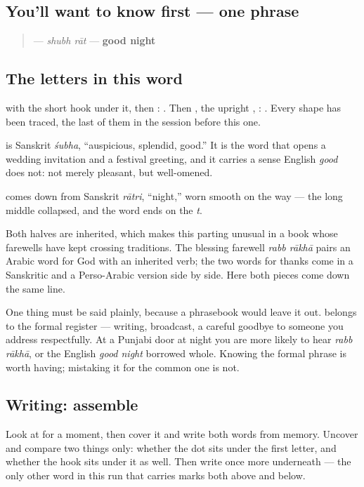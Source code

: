 \subsection*{You'll want to know first — one phrase}
\begin{quote}
\textbf{ } — \emph{shubh rāt} — \textbf{good night}
\end{quote}

\subsection*{The letters in this word}
\textbf{} with the short hook under it, then \textbf{}: \textbf{}. Then \textbf{}, the upright \textbf{}, \textbf{}: \textbf{}. Every shape has been traced, the last of them in the session before this one.

\begin{cousinweb}
\textbf{} is Sanskrit \emph{śubha}, \textquotedblleft{}auspicious, splendid, good.\textquotedblright{} It is the word that opens a wedding invitation and a festival greeting, and it carries a sense English \emph{good} does not: not merely pleasant, but well-omened.

\textbf{} comes down from Sanskrit \emph{rātri}, \textquotedblleft{}night,\textquotedblright{} worn smooth on the way — the long middle collapsed, and the word ends on the \emph{t}.

Both halves are inherited, which makes this parting unusual in a book whose farewells have kept crossing traditions. The blessing farewell \emph{rabb rākhā} pairs an Arabic word for God with an inherited verb; the two words for thanks come in a Sanskritic and a Perso-Arabic version side by side. Here both pieces come down the same line.

One thing must be said plainly, because a phrasebook would leave it out. \textbf{ } belongs to the formal register — writing, broadcast, a careful goodbye to someone you address respectfully. At a Punjabi door at night you are more likely to hear \emph{rabb rākhā}, or the English \emph{good night} borrowed whole. Knowing the formal phrase is worth having; mistaking it for the common one is not.
\end{cousinweb}

\subsection*{Writing: assemble  }
Look at \textbf{ } for a moment, then cover it and write both words from memory. Uncover and compare two things only: whether the dot sits under the first letter, and whether the hook sits under it as well. Then write \textbf{} once more underneath — the only other word in this run that carries marks both above and below.

